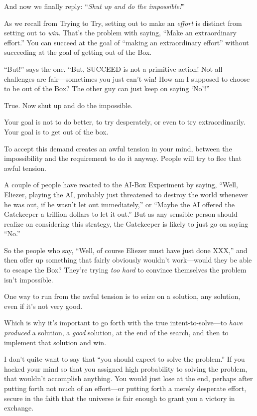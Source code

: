 {
 And now we finally reply: ``\textit{Shut up and
do the impossible!}''}

{
 As we recall from Trying to Try, setting out to make an
\textit{effort} is distinct from setting out to \textit{win}.
That's the problem with saying, ``Make
an extraordinary effort.'' You can succeed at the
goal of ``making an extraordinary
effort'' without succeeding at the goal of getting
out of the Box.}

{
 ``But!'' says the one.
``But, SUCCEED is not a primitive action! Not all
challenges are fair---sometimes you just can't win! How
am I supposed to choose to be out of the Box? The other guy can just
keep on saying
`No'!''}

{
 True. Now shut up and do the impossible.}

{
 Your goal is not to do better, to try desperately, or even to try
extraordinarily. Your goal is to get out of the box.}

{
 To accept this demand creates an awful tension in your mind,
between the impossibility and the requirement to do it anyway. People
will try to flee that awful tension.}

{
 A couple of people have reacted to the AI-Box Experiment by
saying, ``Well, Eliezer, playing the AI, probably just
threatened to destroy the world whenever he was out, if he
wasn't let out immediately,'' or
``Maybe the AI offered the Gatekeeper a trillion
dollars to let it out.'' But as any sensible person
should realize on considering this strategy, the Gatekeeper is likely
to just go on saying ``No.''}

{
 So the people who say, ``Well, of course Eliezer
must have just done XXX,'' and then offer up
something that fairly obviously wouldn't work---would
they be able to escape the Box? They're trying
\textit{too hard} to convince themselves the problem
isn't impossible.}

{
 One way to run from the awful tension is to seize on a solution,
any solution, even if it's not very good.}

{
 Which is why it's important to go forth with the
true intent-to-solve---to \textit{have produced} a solution, a
\textit{good} solution, at the end of the search, and then to implement
that solution and win.}

{
 I don't quite want to say that
``you should expect to solve the
problem.'' If you hacked your mind so that you
assigned high probability to solving the problem, that
wouldn't accomplish anything. You would just lose at
the end, perhaps after putting forth not much of an effort---or putting
forth a merely desperate effort, secure in the faith that the universe
is fair enough to grant you a victory in exchange.}

